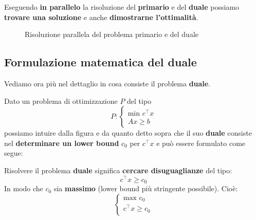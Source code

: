 Eseguendo \textbf{in parallelo} la risoluzione del \textbf{primario} e del \textbf{duale}
possiamo \textbf{trovare una soluzione} e anche \textbf{dimostrarne l'ottimalità}.

\begin{figure}[!ht]
    \centering
    \caption{Risoluzione parallela del problema primario e del duale}
\end{figure}

\subsection{Formulazione matematica del duale}

Vediamo ora più nel dettaglio in cosa consiste il problema \textbf{duale}.

Dato un problema di ottimizzazione $P$ del tipo
\[
    P: \begin{cases}
        \text{min } c^\top x \\ 
        Ax \ge b
    \end{cases}
\]
possiamo intuire dalla figura e da quanto detto sopra che il suo \textbf{duale} 
consiste nel \textbf{determinare un lower bound} $c_{0}$ per $c^\top x$ e 
può essere formulato come segue:

\begin{remark}
    Risolvere il problema \textbf{duale} significa \textbf{cercare disuguaglianze}
    del tipo:
    \[
        c^\top x \ge c_{0}
    \] 
    In modo che $c_{0}$ sia \textbf{massimo} (lower bound più stringente possibile).
    Cioè:
    \[
        \begin{cases}
            \text{max } c_{0} \\ 
            c^\top x \ge c_{0}
        \end{cases}
    \]
\end{remark}

